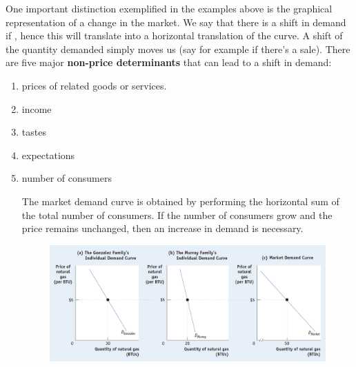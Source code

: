 \documentclass[english,course,draft]{Notes}
\begin{document}
		
	\par{One important distinction exemplified in the examples above is the graphical representation of a change in the market. We say that there is a shift in demand if , hence this will translate into a horizontal translation of the curve. A shift of the quantity demanded simply moves us  (say for example if there's a sale). There are five major \textbf{non-price determinants} that can lead to a shift in demand:}
	\begin{enumerate}
	\item  prices of related goods or services. 
	
	
	\item income
	
	
	
	\item tastes
	\item expectations
	
	\item number of consumers
	
	
	\par{The market demand curve is obtained by performing the horizontal sum of the total number of consumers. If the number of consumers grow and the price remains unchanged, then an increase in demand is necessary.}
		\begin{figure}[ht]
\centering
\includegraphics[width=\textwidth]{demandIndividual}
\end{figure}

	\end{enumerate}
	
\end{document}
